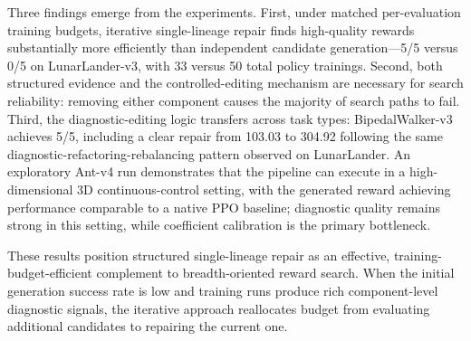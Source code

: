 \documentclass[letterpaper,twocolumn,10pt]{article}
\begin{document}
Three findings emerge from the experiments. First, under matched per-evaluation training budgets, iterative single-lineage repair finds high-quality rewards substantially more efficiently than independent candidate generation---5/5 versus 0/5 on LunarLander-v3, with 33 versus 50 total policy trainings. Second, both structured evidence and the controlled-editing mechanism are necessary for search reliability: removing either component causes the majority of search paths to fail. Third, the diagnostic-editing logic transfers across task types: BipedalWalker-v3 achieves 5/5, including a clear repair from 103.03 to 304.92 following the same diagnostic-refactoring-rebalancing pattern observed on LunarLander. An exploratory Ant-v4 run demonstrates that the pipeline can execute in a high-dimensional 3D continuous-control setting, with the generated reward achieving performance comparable to a native PPO baseline; diagnostic quality remains strong in this setting, while coefficient calibration is the primary bottleneck.

These results position structured single-lineage repair as an effective, training-budget-efficient complement to breadth-oriented reward search. When the initial generation success rate is low and training runs produce rich component-level diagnostic signals, the iterative approach reallocates budget from evaluating additional candidates to repairing the current one.



\end{document}
